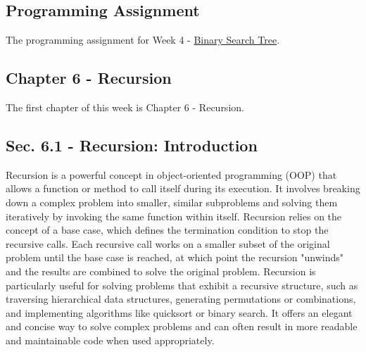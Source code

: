 \subsection{Programming Assignment}
The programming assignment for Week 4 - \href{https://github.com/cu-cspb-2270-Summer-2023/pa3-RelativiBit}{Binary Search Tree}.

\subsection{Chapter 6 - Recursion}

The first chapter of this week is Chapter 6 - Recursion.

\subsection*{Sec. 6.1 - Recursion: Introduction}

Recursion is a powerful concept in object-oriented programming (OOP) that allows a function or method to call itself during its execution. It involves breaking down a complex problem into smaller, similar subproblems and solving them iteratively 
by invoking the same function within itself. Recursion relies on the concept of a base case, which defines the termination condition to stop the recursive calls. Each recursive call works on a smaller subset of the original problem until the base 
case is reached, at which point the recursion "unwinds" and the results are combined to solve the original problem. Recursion is particularly useful for solving problems that exhibit a recursive structure, such as traversing hierarchical data structures, 
generating permutations or combinations, and implementing algorithms like quicksort or binary search. It offers an elegant and concise way to solve complex problems and can often result in more readable and maintainable code when used appropriately.

